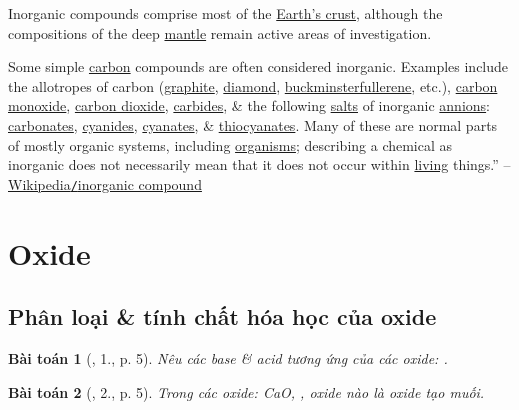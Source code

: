 \documentclass{article}
\newtheorem{baitoan}{Bài toán}
\begin{document}
Inorganic compounds comprise most of the \href{https://en.wikipedia.org/wiki/Earth%27s_crust}{Earth's crust}, although the compositions of the deep \href{https://en.wikipedia.org/wiki/Mantle_(geology)}{mantle} remain active areas of investigation.

Some simple \href{https://en.wikipedia.org/wiki/Carbon}{carbon} compounds are often considered inorganic. Examples include the allotropes of carbon (\href{https://en.wikipedia.org/wiki/Graphite}{graphite}, \href{https://en.wikipedia.org/wiki/Diamond}{diamond}, \href{https://en.wikipedia.org/wiki/Buckminsterfullerene}{buckminsterfullerene}, etc.), \href{https://en.wikipedia.org/wiki/Carbon_monoxide}{carbon monoxide}, \href{https://en.wikipedia.org/wiki/Carbon_dioxide}{carbon dioxide}, \href{https://en.wikipedia.org/wiki/Carbide}{carbides}, \& the following \href{https://en.wikipedia.org/wiki/Salt_(chemistry)}{salts} of inorganic \href{https://en.wikipedia.org/wiki/Anion}{annions}: \href{https://en.wikipedia.org/wiki/Carbonate}{carbonates}, \href{https://en.wikipedia.org/wiki/Cyanide}{cyanides}, \href{https://en.wikipedia.org/wiki/Cyanate}{cyanates}, \& \href{https://en.wikipedia.org/wiki/Thiocyanate}{thiocyanates}. Many of these are normal parts of mostly organic systems, including \href{https://en.wikipedia.org/wiki/Organism}{organisms}; describing a chemical as inorganic does not necessarily mean that it does not occur within \href{https://en.wikipedia.org/wiki/Life}{living} things.'' -- \href{https://en.wikipedia.org/wiki/Inorganic_compound}{Wikipedia\texttt{/}inorganic compound}


\section{Oxide}

\subsection{Phân loại \& tính chất hóa học của oxide}

\begin{baitoan}[\cite{An_350_BT_Hoa_Hoc_9}, 1., p. 5]
	Nêu các base \& acid tương ứng của các oxide: \emph{}.
\end{baitoan}

\begin{baitoan}[\cite{An_350_BT_Hoa_Hoc_9}, 2., p. 5]
	Trong các oxide: \emph{CaO, }, oxide nào là oxide tạo muối.
\end{baitoan}
\end{document}
